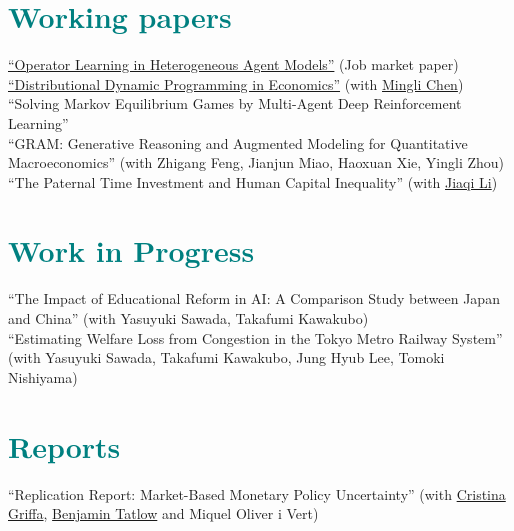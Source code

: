 \documentclass[A4,11pt]{article}
\begin{document}
\section{\textbf{\Large{\textcolor{teal}{Working papers}}}}
\smallskip\smallskip
\justifying
\href{https://yaolangzhong.github.io/assets/papers/operator_learning.pdf}{``Operator Learning in Heterogeneous Agent Models''} (Job market paper) \\
\smallskip
\noindent 
\href{https://yaolangzhong.github.io/assets/papers/distributional_dynamic_programming.pdf}{``Distributional Dynamic Programming in Economics''} (with \href{https://warwick.ac.uk/fac/soc/economics/staff/mchen/}{Mingli Chen})\\
\smallskip
\noindent ``Solving Markov Equilibrium Games by Multi-Agent Deep Reinforcement Learning''\\
\smallskip
\noindent ``GRAM: Generative Reasoning and Augmented Modeling for Quantitative Macroeconomics'' (with Zhigang Feng, Jianjun Miao, Haoxuan Xie, Yingli Zhou)\\
\smallskip
\noindent ``The Paternal Time Investment and
Human Capital Inequality'' (with \href{https://warwick.ac.uk/fac/soc/economics/staff/jli/}{Jiaqi Li})

\section{\textbf{\Large{\textcolor{teal}{Work in Progress}}}}
\smallskip\smallskip
``The Impact of Educational Reform in AI: A Comparison Study between Japan and China'' (with Yasuyuki Sawada, Takafumi Kawakubo) \\
\smallskip
\noindent
``Estimating Welfare Loss from Congestion in the Tokyo Metro Railway System'' (with Yasuyuki Sawada, Takafumi Kawakubo, Jung Hyub Lee, Tomoki Nishiyama) \\
\smallskip
\noindent

\section{\textbf{\Large{\textcolor{teal}{Reports}}}}
\smallskip\smallskip
\justifying
``Replication Report: Market-Based Monetary Policy Uncertainty'' (with \href{https://cristina-griffa.cristinagriffa.com/home}{Cristina Griffa}, \href{https://btatlow.com/}{Benjamin Tatlow} and Miquel Oliver i Vert)\\
\end{document}
